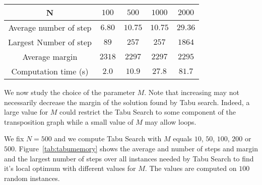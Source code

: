 \begin{center}
\begin{tabular}{ |c|c|c|c|c| }
\hline
    N & $100$&$500$& $1000$& $2000$\\
    \hline
    Average number of step & $6.80$ & $10.75$& $10.75$& $29.36$\\
    \hline
    Largest Number of step & $89$ & $257$& $257$& $1864$\\

    \hline

     Average margin & $2318$ & $2297$& $2297$& $2295$\\

    \hline
    Computation time (s) & $2.0$ & $10.9$& $27.8$& $81.7$\\

    \hline
 \end{tabular}
\end{center}




We now study the choice of the parameter $M$. Note that increasing may not necessarily decrease the margin
of the solution found by Tabu search. Indeed, a large value for $M$ could restrict the Tabu Search to some component of the transposition graph while a small value of $M$ may allow loops.

We fix $N = 500$ and we compute Tabu Search with $M$ equals $10$, $50$, $100$, $200$ or $500$.
Figure~\ref{tab:tabumemory} shows the average and number of steps and margin and the largest number of steps over all instances needed by Tabu Search to find it's local optimum with different values for $M$. The values are computed on $100$ random instances.

